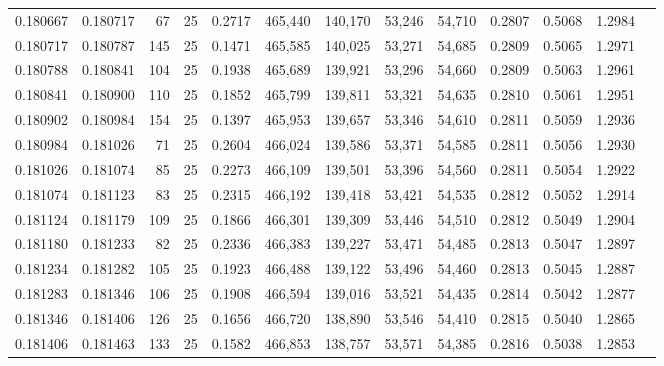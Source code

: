 \begin{tabular}{rrrrrrrrrrrrr}
0.180667 & 0.180717 &    67 &  25 &                                     0.2717 & 465,440 & 140,170 &  53,246 &  54,710 & 0.2807 & 0.5068 & 1.2984 \\
0.180717 & 0.180787 &   145 &  25 &                                     0.1471 & 465,585 & 140,025 &  53,271 &  54,685 & 0.2809 & 0.5065 & 1.2971 \\
0.180788 & 0.180841 &   104 &  25 &                                     0.1938 & 465,689 & 139,921 &  53,296 &  54,660 & 0.2809 & 0.5063 & 1.2961 \\
0.180841 & 0.180900 &   110 &  25 &                                     0.1852 & 465,799 & 139,811 &  53,321 &  54,635 & 0.2810 & 0.5061 & 1.2951 \\
0.180902 & 0.180984 &   154 &  25 &                                     0.1397 & 465,953 & 139,657 &  53,346 &  54,610 & 0.2811 & 0.5059 & 1.2936 \\
0.180984 & 0.181026 &    71 &  25 &                                     0.2604 & 466,024 & 139,586 &  53,371 &  54,585 & 0.2811 & 0.5056 & 1.2930 \\
0.181026 & 0.181074 &    85 &  25 &                                     0.2273 & 466,109 & 139,501 &  53,396 &  54,560 & 0.2811 & 0.5054 & 1.2922 \\
0.181074 & 0.181123 &    83 &  25 &                                     0.2315 & 466,192 & 139,418 &  53,421 &  54,535 & 0.2812 & 0.5052 & 1.2914 \\
0.181124 & 0.181179 &   109 &  25 &                                     0.1866 & 466,301 & 139,309 &  53,446 &  54,510 & 0.2812 & 0.5049 & 1.2904 \\
0.181180 & 0.181233 &    82 &  25 &                                     0.2336 & 466,383 & 139,227 &  53,471 &  54,485 & 0.2813 & 0.5047 & 1.2897 \\
0.181234 & 0.181282 &   105 &  25 &                                     0.1923 & 466,488 & 139,122 &  53,496 &  54,460 & 0.2813 & 0.5045 & 1.2887 \\
0.181283 & 0.181346 &   106 &  25 &                                     0.1908 & 466,594 & 139,016 &  53,521 &  54,435 & 0.2814 & 0.5042 & 1.2877 \\
0.181346 & 0.181406 &   126 &  25 &                                     0.1656 & 466,720 & 138,890 &  53,546 &  54,410 & 0.2815 & 0.5040 & 1.2865 \\
0.181406 & 0.181463 &   133 &  25 &                                     0.1582 & 466,853 & 138,757 &  53,571 &  54,385 & 0.2816 & 0.5038 & 1.2853 \\

\end{tabular}

